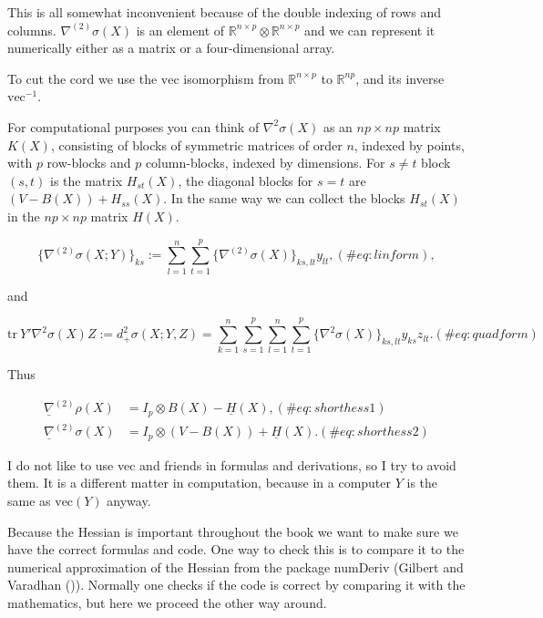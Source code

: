 \documentclass[
  12pt,
  letterpaper,
  DIV=11,
  numbers=noendperiod]{scrreprt}
\theoremstyle{remark}
\begin{document}
This is all somewhat inconvenient because of the double indexing of rows
and columns. \(\nabla^{(2)}\sigma(X)\) is an element of
\(\mathbb{R}^{n\times p}\otimes\mathbb{R}^{n\times p}\) and we can
represent it numerically either as a matrix or a four-dimensional array.

To cut the cord we use the \(\text{vec}\) isomorphism from
\(\mathbb{R}^{n\times p}\) to \(\mathbb{R}^{np}\), and its inverse
\(\text{vec}^{-1}\).

For computational purposes you can think of \(\nabla^2\sigma(X)\) as an
\(np\times np\) matrix \(K(X)\), consisting of blocks of symmetric
matrices of order \(n\), indexed by points, with \(p\) row-blocks and
\(p\) column-blocks, indexed by dimensions. For \(s\not= t\) block
\((s,t)\) is the matrix \(H_{st}(X)\), the diagonal blocks for \(s=t\)
are \((V-B(X))+H_{ss}(X)\). In the same way we can collect the blocks
\(H_{st}(X)\) in the \(np\times np\) matrix \(H(X)\).

\begin{equation}
\{\nabla^{(2)}\sigma(X;Y)\}_{ks}:=\sum_{l=1}^n\sum_{t=1}^p\{\nabla^{(2)}\sigma(X)\}_{ks,lt}y_{lt},
(\#eq:linform),
\end{equation}

and

\begin{equation}
\text{tr}\ Y'\nabla^2\sigma(X)Z:=d_+^2\sigma(X;Y,Z)=\sum_{k=1}^n\sum_{s=1}^p\sum_{l=1}^n\sum_{t=1}^p\{\nabla^2\sigma(X)\}_{ks,lt}y_{ks}z_{lt}.
(\#eq:quadform)
\end{equation}

Thus

\begin{align}
\underline{\nabla}^{(2)}\rho(X)&=I_p\otimes B(X)-\underline{H}(X),(\#eq:shorthess1)\\
\underline{\nabla}^{(2)}\sigma(X)&=I_p\otimes(V-B(X))+\underline{H}(X).(\#eq:shorthess2)
\end{align}

I do not like to use vec and friends in formulas and derivations, so I
try to avoid them. It is a different matter in computation, because in a
computer \(Y\) is the same as \(\text{vec}(Y)\) anyway.

Because the Hessian is important throughout the book we want to make
sure we have the correct formulas and code. One way to check this is to
compare it to the numerical approximation of the Hessian from the
package numDeriv (Gilbert and Varadhan
()). Normally one checks if the
code is correct by comparing it with the mathematics, but here we
proceed the other way around.
\end{document}
